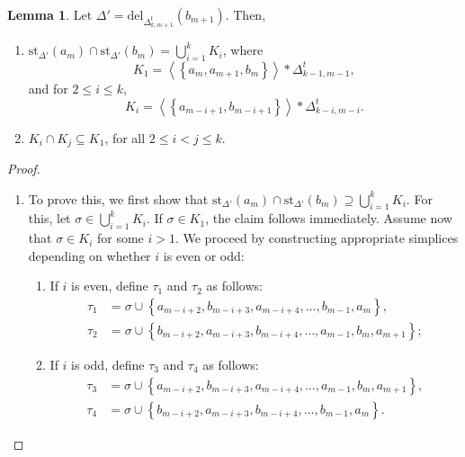 \documentclass[11pt,reqno,a4paper]{amsart}
\theoremstyle{definition}
\theoremstyle{theorem}
\newtheorem{lemma}[theorem]{Lemma}
\newcommand{\lno}{\left(}
\newcommand{\rno}{\right)}
\newcommand{\lcu}{\left\{}
\newcommand{\rcu}{\right\}}
\newcommand{\del}{\mathrm{del}}
\newcommand{\st}{\mathrm{st}}
\theoremstyle{remark}
\begin{document}
\begin{lemma}\label{claim: homotopy of total k-cut of 2×n gg}
Let $\Delta' = \del_{\Delta_{k,m+1}^t}\lno b_{m+1} \rno$. Then,
    \begin{enumerate}
        \item $\st_{\Delta'}\lno a_m \rno \cap \st_{\Delta'}\lno b_m \rno = \bigcup\limits_{i=1}^k K_i$, where $$K_1 = \left\langle \lcu a_m, a_{m+1}, b_m \rcu\right\rangle * \Delta_{k-1, m-1}^t,$$ and for $2\leq i \leq k$, $$K_i = \left\langle \lcu a_{m-i+1}, b_{m-i+1} \rcu\right\rangle * \Delta_{k-i, m-i}^t.$$ 

        \item $K_i \cap K_j \subseteq K_1$, for all $2 \leq i < j \leq k$. 
    \end{enumerate}  
\end{lemma}
    \begin{proof}
    
    \begin{enumerate}
        \item To prove this, we first show that 
$\st_{\Delta'}\lno a_m \rno \cap \st_{\Delta'}\lno b_m \rno \supseteq \bigcup\limits_{i=1}^k K_i.$
For this, let $\sigma \in \bigcup\limits_{i=1}^k K_i$. If $\sigma \in K_1$, the claim follows immediately. 
Assume now that $\sigma \in K_i$ for some $i > 1$. We proceed by constructing appropriate simplices depending on whether $i$ is even or odd:

\begin{enumerate}
    \item If $i$ is even, define $\tau_1$ and $\tau_2$ as follows:
    \begin{align*}
        \tau_1 &= \sigma \cup \lcu a_{m-i+2}, b_{m-i+3}, a_{m-i+4}, \dots, b_{m-1}, a_m \rcu,\\
        \tau_2 &= \sigma \cup \lcu b_{m-i+2}, a_{m-i+3}, b_{m-i+4}, \dots, a_{m-1}, b_m, a_{m+1} \rcu;
    \end{align*}

    \item If $i$ is odd, define $\tau_3$ and $\tau_4$ as follows:
    \begin{align*}
        \tau_3 &= \sigma \cup \lcu a_{m-i+2}, b_{m-i+3}, a_{m-i+4}, \dots, a_{m-1}, b_m, a_{m+1} \rcu,\\
        \tau_4 &= \sigma \cup \lcu b_{m-i+2}, a_{m-i+3}, b_{m-i+4}, \dots, b_{m-1}, a_m \rcu.
    \end{align*}
\end{enumerate}


\end{enumerate}
\end{proof}
\end{document}
